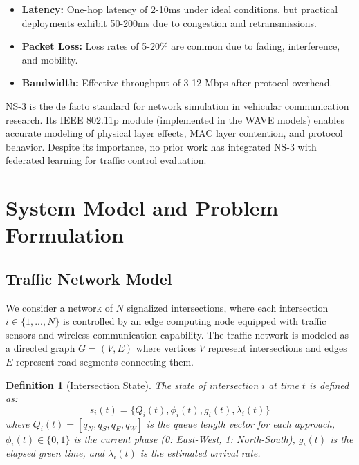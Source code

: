 \documentclass[conference]{IEEEtran}
\newtheorem{definition}{Definition}
\begin{document}
\begin{itemize}
    \item \textbf{Latency:} One-hop latency of 2-10ms under ideal conditions, but practical deployments exhibit 50-200ms due to congestion and retransmissions.
    \item \textbf{Packet Loss:} Loss rates of 5-20\% are common due to fading, interference, and mobility.
    \item \textbf{Bandwidth:} Effective throughput of 3-12 Mbps after protocol overhead.
\end{itemize}

NS-3 \cite{ns3} is the de facto standard for network simulation in vehicular communication research. Its IEEE 802.11p module (implemented in the WAVE models) enables accurate modeling of physical layer effects, MAC layer contention, and protocol behavior. Despite its importance, no prior work has integrated NS-3 with federated learning for traffic control evaluation.

\section{System Model and Problem Formulation}

\subsection{Traffic Network Model}
We consider a network of $N$ signalized intersections, where each intersection $i \in \{1, ..., N\}$ is controlled by an edge computing node equipped with traffic sensors and wireless communication capability. The traffic network is modeled as a directed graph $G = (V, E)$ where vertices $V$ represent intersections and edges $E$ represent road segments connecting them.

\begin{definition}[Intersection State]
The state of intersection $i$ at time $t$ is defined as:
\begin{equation}
s_i(t) = \{Q_i(t), \phi_i(t), g_i(t), \lambda_i(t)\}
\end{equation}
where $Q_i(t) = [q_N, q_S, q_E, q_W]$ is the queue length vector for each approach, $\phi_i(t) \in \{0, 1\}$ is the current phase (0: East-West, 1: North-South), $g_i(t)$ is the elapsed green time, and $\lambda_i(t)$ is the estimated arrival rate.
\end{definition}
\end{document}
